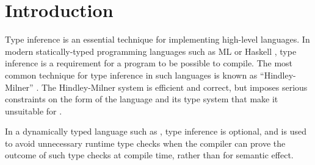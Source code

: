 \section{Introduction}

Type inference is an essential technique for implementing high-level
languages.  In modern statically-typed programming languages such as
ML \cite{Milner:1997:DSM:549659} or Haskell
\cite{Hudak:2007:HHL:1238844.1238856}, type inference is a requirement
for a program to be possible to compile.  The most common technique
for type inference in such languages is known as ``Hindley-Milner''
\cite{Damas:1982:PTF:582153.582176}. The Hindley-Milner system is
efficient and correct, but imposes serious constraints on the form of
the language and its type system that make it unsuitable for
\commonlisp{}.

In a dynamically typed language such as \commonlisp{}
\cite{ansi:common:lisp}, type inference is optional, and is used to
avoid unnecessary runtime type checks when the compiler can prove the
outcome of such type checks at compile time, rather than for semantic
effect.
